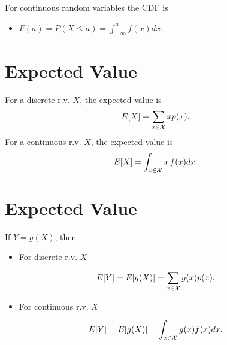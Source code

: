 \documentclass[letterpaper,10pt,english]{sphinxmanual}
\begin{document}
For continuous random variables the CDF is
\begin{itemize}
\item {} 
$F(a) = P(X \leq a) = \int_{-\infty}^a f(x) dx.$

\end{itemize}


\section{Expected Value}
\label{probability:expected-value}
For a discrete r.v. $X$, the expected value is
\begin{gather}
\begin{split}E[X] = \sum_{x\in \mathcal{X}} x p(x).\end{split}\notag
\end{gather}
For a continuous r.v. $X$, the expected value is
\begin{gather}
\begin{split}E[X] = \int_{x\in \mathcal{X}} x \, f(x) dx.\end{split}\notag
\end{gather}

\section{Expected Value}
\label{probability:id1}
If $Y = g(X)$, then
\begin{itemize}
\item {} 
For discrete r.v. $X$

\end{itemize}
\begin{gather}
\begin{split}E[Y] = E[g(X)] = \sum_{x \in \mathcal{X}} g(x)p(x).\end{split}\notag
\end{gather}\begin{itemize}
\item {} 
For continuous r.v. $X$

\end{itemize}
\begin{gather}
\begin{split}E[Y] = E[g(X)] = \int_{x \in \mathcal{X}} g(x)f(x)dx.\end{split}\notag
\end{gather}
\end{document}
